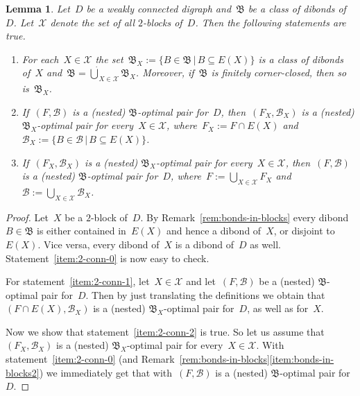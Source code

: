 \documentclass[reqno, 12pt]{amsart}
\numberwithin{equation}{section}
\numberwithin{figure}{section}
\theoremstyle{plain}
\newtheorem{lemma}[thm]{Lemma}
\theoremstyle{definition}
\begin{document}
\begin{lemma}
    \label{lem:2-con-L-Y}
    Let~$D$ be a weakly connected digraph and~$\mathfrak{B}$ be a 
    class of dibonds of~$D$. 
    Let~$\mathcal{X}$ denote the set of all $2$-blocks of~$D$. 
    Then the following statements are true. 
    \begin{enumerate}[label=\textit{(\roman*)}]
        \item \label{item:2-conn-0}
            {For each~${X \in \mathcal{X}}$ the set~${\mathfrak{B}_X := \{ B \in \mathfrak{B} \, | \, B \subseteq E(X) \}}$ is a 
            class of dibonds of~$X$ 
            and~${\mathfrak{B} = \dot{\bigcup}_{X \in \mathcal{X}} \mathfrak{B}_X}$. 
            Moreover, if~$\mathfrak{B}$ is finitely corner-closed, then so is~${\mathfrak{B}_X}$.}
        \item \label{item:2-conn-1} 
            {If~${(F, \mathcal{B})}$ is a (nested) $\mathfrak{B}$-optimal pair for~$D$, 
            then~${(F_X, \mathcal{B}_X)}$ is a (nested) $\mathfrak{B}_X$-optimal pair for every~${X \in \mathcal{X}}$, 
            where~${F_X := F \cap E(X)}$ and~${\mathcal{B}_X := \{ B \in \mathcal{B} \, | \, B \subseteq E(X) \}}$.}
        \item \label{item:2-conn-2} 
            {If~${(F_X, \mathcal{B}_X)}$ is a (nested) $\mathfrak{B}_X$-optimal pair for every~${X \in \mathcal{X}}$, 
            then~${(F, \mathcal{B})}$ is a (nested) $\mathfrak{B}$-optimal pair for~$D$, 
            where~${F := \bigcup_{X \in \mathcal{X}} F_X}$ and~${\mathcal{B} := \bigcup_{X \in \mathcal{X}} \mathcal{B}_X}$.}
    \end{enumerate}
\end{lemma}

\begin{proof}
    Let~$X$ be a $2$-block of~$D$. 
    By Remark~\ref{rem:bonds-in-blocks} every dibond~${B \in \mathfrak{B}}$ is either contained in~$E(X)$ and hence a dibond of~$X$, or disjoint to~$E(X)$. 
    Vice versa, every dibond of~$X$ is a dibond of~$D$ as well. 
    Statement~\ref{item:2-conn-0} is now easy to check. 
    
    For statement~\ref{item:2-conn-1}, 
    let~${X \in \mathcal{X}}$ and let~${(F, \mathcal{B})}$ be a (nested) $\mathfrak{B}$-optimal pair for~$D$. 
    Then by just translating the definitions we obtain that~${(F \cap E(X), \mathcal{B}_X)}$ is a (nested) $\mathfrak{B}_X$-optimal pair for~$D$, as well as for~$X$. 
    
    Now we show that statement~\ref{item:2-conn-2} is true.
    So let us assume that~${(F_X, \mathcal{B}_X)}$ is a (nested) $\mathfrak{B}_X$-optimal pair for every~${X \in \mathcal{X}}$. 
    With statement~\ref{item:2-conn-0} (and Remark~\ref{rem:bonds-in-blocks}\ref{item:bonds-in-blocks2}) we immediately get that with~${(F, \mathcal{B})}$ is a (nested) $\mathfrak{B}$-optimal pair for~$D$. 
\end{proof}
\end{document}
